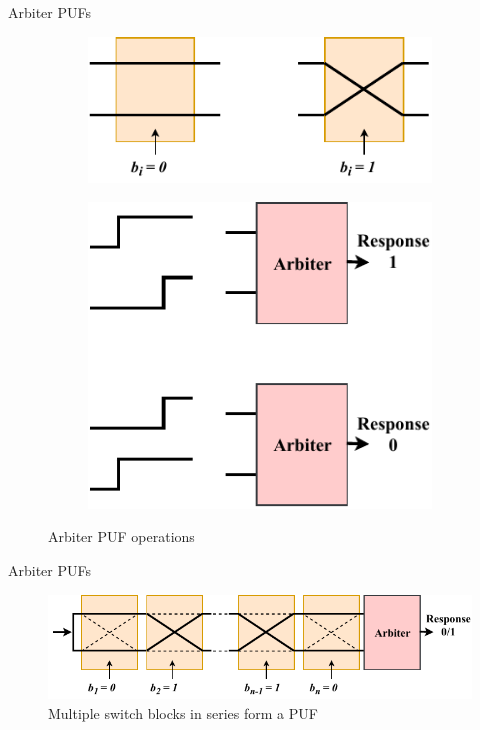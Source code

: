 \documentclass[10pt, compress]{beamer}
\begin{document}
\begin{frame}{Arbiter PUFs}
    \begin{figure}[ht]
        \centering
        \begin{subfigure}[b]{0.58\textwidth}
            \includegraphics[width=\textwidth]{figures/switch_block_operations.pdf}
            \label{fig:switch_block_operations}
        \end{subfigure}
        \begin{subfigure}[b]{0.33\textwidth}
            \includegraphics[width=\textwidth]{figures/arbiter_operation.pdf}
            \label{fig:arbiter_operations}
        \end{subfigure}
        \caption{Arbiter PUF operations}\label{fig:puf_operations}
    \end{figure}
\end{frame}

\begin{frame}{Arbiter PUFs}
    \begin{figure}
        \centering
        \includegraphics[width=\textwidth]{figures/multiple_switch_blocks.pdf}
        \caption{Multiple switch blocks in series form a PUF}
    \end{figure}
\end{frame}
\end{document}

